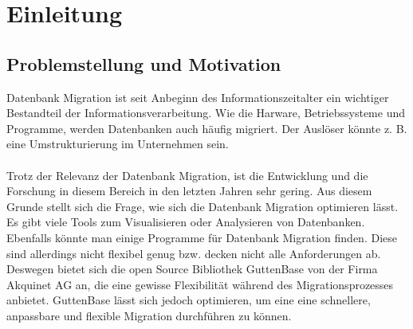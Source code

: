 \chapter{Einleitung}

\section{Problemstellung und Motivation}


Datenbank Migration ist seit Anbeginn des Informationszeitalter ein wichtiger Bestandteil der Informationsverarbeitung. Wie die Harware, Betriebssysteme und Programme, werden Datenbanken auch häufig migriert. Der Auslöser könnte z. B. eine Umstrukturierung im Unternehmen sein. \\ \\
Trotz der Relevanz der Datenbank Migration, ist die Entwicklung und die Forschung in diesem Bereich in den letzten Jahren sehr gering. Aus diesem Grunde stellt sich die Frage, wie sich die Datenbank Migration optimieren lässt.\\

Es gibt viele Tools zum Visualisieren oder Analysieren von  Datenbanken. Ebenfalls könnte man einige Programme für Datenbank Migration finden. Diese sind allerdings nicht flexibel genug bzw. decken nicht alle Anforderungen ab. Deswegen bietet sich die open Source Bibliothek GuttenBase von der Firma Akquinet AG an, die eine gewisse Flexibilität während des Migrationsprozesses anbietet. GuttenBase lässt sich jedoch optimieren, um eine eine schnellere, anpassbare und flexible Migration durchführen zu können. 
